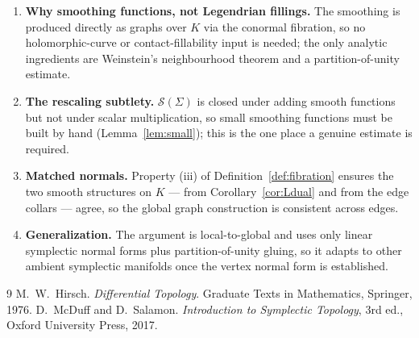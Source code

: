 \documentclass[11pt]{article}
\newcommand{\Sm}{\mathscr S}
\theoremstyle{definition}
\begin{document}
\begin{enumerate}\setlength\itemsep{4pt}
\item \textbf{Why smoothing functions, not Legendrian fillings.} The smoothing is
produced directly as graphs over $K$ via the conormal fibration, so no
holomorphic-curve or contact-fillability input is needed; the only analytic
ingredients are Weinstein's neighbourhood theorem and a partition-of-unity
estimate.
\item \textbf{The rescaling subtlety.} $\Sm(\Sigma)$ is closed under adding
smooth functions but not under scalar multiplication, so small smoothing
functions must be built by hand (Lemma~\ref{lem:small}); this is the one place a
genuine estimate is required.
\item \textbf{Matched normals.} Property (iii) of Definition~\ref{def:fibration}
ensures the two smooth structures on $K$ — from Corollary~\ref{cor:Ldual} and from
the edge collars — agree, so the global graph construction is consistent across
edges.
\item \textbf{Generalization.} The argument is local-to-global and uses only
linear symplectic normal forms plus partition-of-unity gluing, so it adapts to
other ambient symplectic manifolds once the vertex normal form is established.
\end{enumerate}

\begin{thebibliography}{9}
 M.~W.~Hirsch.
  \emph{Differential Topology}. Graduate Texts in Mathematics, Springer, 1976.
 D.~McDuff and D.~Salamon.
  \emph{Introduction to Symplectic Topology}, 3rd ed.,
  Oxford University Press, 2017.
\end{thebibliography}
\end{document}
